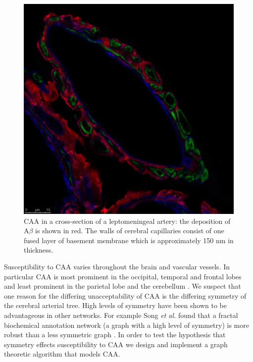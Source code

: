 \documentclass[10pt]{amsart} %
\theoremstyle{definition}
\begin{document}
\begin{figure}[h]

              \centering
               \includegraphics[scale=0.15]{abeta.jpg}
                \caption{CAA in a cross-section of a leptomeningeal artery: the deposition of A$\beta$ is shown in red.  The walls of cerebral capillaries consist of one fused layer of basement membrane which is approximately 150 nm in thickness.}\label{figy:2}
\end{figure}

Susceptibility to CAA varies throughout the brain and vascular vessels.  In particular  
CAA  is most prominent in the occipital, temporal and frontal lobes and least prominent in the parietal lobe and the cerebellum %
\cite{Preston}. We suspect that one reason for the differing unacceptability of CAA is the differing symmetry of the cerebral arterial tree.  High levels of symmetry have been shown to be advantageous in other networks.  For example Song \emph{et al.} found that a fractal biochemical annotation  network (a graph with a high level of symmetry) is more robust than a less symmetric graph \cite{Song}.  In order to test the hypothesis that symmetry effects susceptibility to CAA we design and implement a graph theoretic algorithm that models CAA.%
\end{document}
